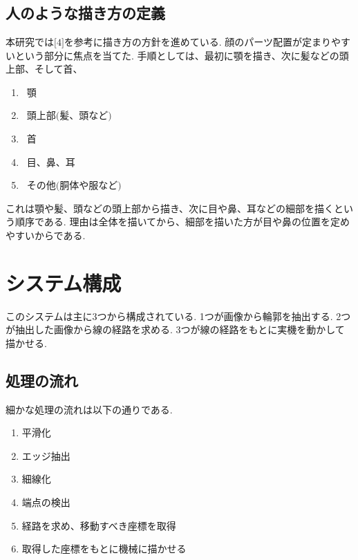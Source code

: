 \documentclass[a4j]{jarticle}			%
\begin{document}
\begin{multicols}{2} %

\section{}

\subsection{人のような描き方の定義}
本研究では$\lbrack4\rbrack$を参考に描き方の方針を進めている.
顔のパーツ配置が定まりやすいという部分に焦点を当てた.
手順としては、最初に顎を描き、次に髪などの頭上部、そして首、
\begin{enumerate}
	\setlength{\parskip}{0cm}
	\setlength{\itemsep}{0cm}
	\item \ 顎\\
	\item \ 頭上部$\lparen \text{髪、頭など} \rparen$\\
	\item \ 首 \\
	\item \ 目、鼻、耳\\
	\item \ その他$\lparen \text{胴体や服など} \rparen$ \\
\end{enumerate} 
これは顎や髪、頭などの頭上部から描き、次に目や鼻、耳などの細部を描くという順序である.
理由は全体を描いてから、細部を描いた方が目や鼻の位置を定めやすいからである.

\section{システム構成}
このシステムは主に3つから構成されている. 
1つが画像から輪郭を抽出する.
2つが抽出した画像から線の経路を求める.
3つが線の経路をもとに実機を動かして描かせる.

\subsection{処理の流れ}
細かな処理の流れは以下の通りである.\\ 
\begin{enumerate}
	\setlength{\parskip}{0cm} %
	\setlength{\itemsep}{0cm} %
	\item 平滑化\\
	\item エッジ抽出\\
	\item 細線化\\
	\item 端点の検出\\
	\item 経路を求め、移動すべき座標を取得\\
	\item 取得した座標をもとに機械に描かせる\\
\end{enumerate}


\end{multicols}
\end{document}
